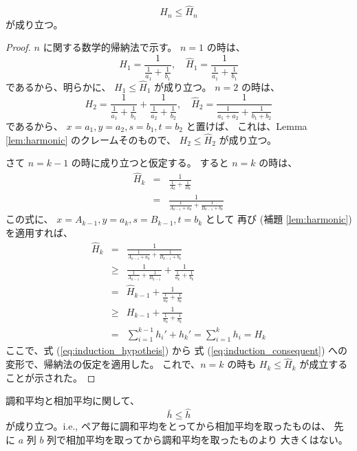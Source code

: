 \documentclass[12pt]{jsarticle}
\def\arithmean#1{\bar{#1}}
\def\arithsum#1{#1}
\def\harmmean#1{\hat{#1}}
\def\harmformula#1#2#3{\frac{#1}{\frac{1}{#2} + \frac{1}{#3}}}
\begin{document}
\begin{theorem}
\begin{equation}
\arithsum{H_n} \le \harmmean{H}_{n}
\end{equation}
が成り立つ。
\end{theorem}

\begin{proof}
$n$ に関する数学的帰納法で示す。
$n=1$ の時は、
\begin{equation}
\arithsum{H}_{1} = \harmformula{1}{a_1}{b_1}, \quad
\harmmean{H}_{1} = \harmformula{1}{a_1}{b_1}
\end{equation}
であるから、明らかに、
$\arithsum{H}_{1} \le \harmmean{H}_{1}$
が成り立つ。
$n = 2$ の時は、
\begin{equation}
\arithsum{H}_{2} = \harmformula{1}{a_1}{b_1} + \harmformula{1}{a_2}{b_2},
\quad
\harmmean{H}_{2} = \harmformula{1}{a_1 + a_2}{b_1 + b_2}
\end{equation}
であるから、
$x = a_1, y = a_2, s = b_1, t = b_2$ と置けば、
これは、Lemma \ref{lem:harmonic} のクレームそのもので、
$\arithsum{H_2} \le \harmmean{H}_{2}$
が成り立つ。

さて $n = k - 1$ の時に成り立つと仮定する。
すると $n = k$ の時は、
\begin{eqnarray}
\harmmean{H}_{k} &=& \harmformula{1}{A_k}{B_k} \\
&=& \harmformula{1}{A_{k-1} + a_k}{B_{k-1} + b_k}
\end{eqnarray}
この式に、
$x = A_{k-1}, y = a_k, s = B_{k-1}, t = b_k$ として
再び (補題 \ref{lem:harmonic}) を適用すれば、
\begin{eqnarray}
\harmmean{H}_{k}
&=& \harmformula{1}{A_{k-1} + a_k}{B_{k-1} + b_k} \nonumber \\
&\ge& \harmformula{1}{A_{k-1}}{B_{k-1}} + \harmformula{1}{a_k}{b_k} \\
&=& \harmmean{H}_{k-1} + \harmformula{1}{a_k}{b_k}
\label{eq:induction_hypotheis} \\
&\ge& \arithsum{H}_{k-1} + \harmformula{1}{a_k}{b_k}
\label{eq:induction_consequent} \\
&=& \sum_{i=1}^{k-1} {h_i}' + {h_k}'
= \sum_{i=1}^{k} {h_i} = \arithsum{H}_{k}
\end{eqnarray}
ここで、式 (\ref{eq:induction_hypotheis}) から
式 (\ref{eq:induction_consequent}) への変形で、帰納法の仮定を適用した。
これで、$n = k$ の時も
$\arithsum{H}_{k} \le \harmmean{H}_{k}$
が成立することが示された。
\end{proof}

\begin{corollary}
調和平均と相加平均に関して、
\begin{equation}
\arithmean{h} \le \harmmean{h}
\end{equation}
が成り立つ。i.e.,
ペア毎に調和平均をとってから相加平均を取ったものは、
先に $a$ 列 $b$ 列で相加平均を取ってから調和平均を取ったものより
大きくはない。
\end{corollary}
\end{document}
